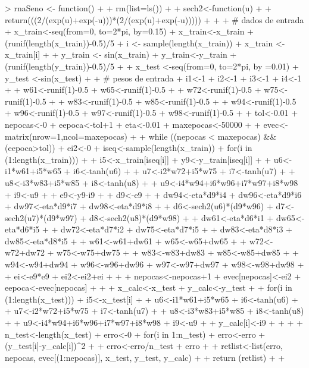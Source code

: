 \documentclass{article}
\begin{document}
\begin{Schunk}
\begin{Sinput}
>   rnaSeno <- function() {
+ 
+   rm(list=ls())
+ 
+   sech2<-function(u)
+   {
+     return(((2/(exp(u)+exp(-u)))*(2/(exp(u)+exp(-u))))) 
+   }
+ 
+   # dados de entrada
+   x_train<-seq(from=0, to=2*pi, by=0.15)
+   x_train<-x_train + (runif(length(x_train))-0.5)/5
+   i <- sample(length(x_train))
+   x_train <- x_train[i]
+ 
+   y_train <- sin(x_train)
+   y_train<-y_train + (runif(length(y_train))-0.5)/5
+ 
+   x_test <-seq(from=0, to=2*pi, by =0.01)
+   y_test <-sin(x_test)
+ 
+   # pesos de entrada
+   i1<-1
+   i2<-1
+   i3<-1
+   i4<-1
+ 
+   w61<-runif(1)-0.5
+   w65<-runif(1)-0.5
+ 
+   w72<-runif(1)-0.5
+   w75<-runif(1)-0.5
+ 
+   w83<-runif(1)-0.5
+   w85<-runif(1)-0.5
+ 
+   w94<-runif(1)-0.5
+   w96<-runif(1)-0.5
+   w97<-runif(1)-0.5
+   w98<-runif(1)-0.5
+ 
+   tol<-0.01
+   nepocas<-0
+   eepoca<-tol+1
+   eta<-0.01
+   maxepocas<-50000
+ 
+   evec<-matrix(nrow=1,ncol=maxepocas) 
+ 
+   while ((nepocas < maxepocas) && (eepoca>tol)){
+     ei2<-0
+     iseq<-sample(length(x_train))
+     for(i in (1:length(x_train))) {
+     
+       i5<-x_train[iseq[i]]
+       y9<-y_train[iseq[i]]
+       
+       u6<-i1*w61+i5*w65
+       i6<-tanh(u6)
+       
+       u7<-i2*w72+i5*w75
+       i7<-tanh(u7)
+       
+       u8<-i3*w83+i5*w85
+       i8<-tanh(u8)
+       
+       u9<-i4*w94+i6*w96+i7*w97+i8*w98
+       i9<-u9
+       
+       e9<-y9-i9
+       
+       d9<-e9
+       
+       dw94<-eta*d9*i4
+       dw96<-eta*d9*i6
+       dw97<-eta*d9*i7
+       dw98<-eta*d9*i8
+ 
+       d6<-sech2(u6)*(d9*w96)
+       d7<-sech2(u7)*(d9*w97)
+       d8<-sech2(u8)*(d9*w98)
+       
+       dw61<-eta*d6*i1
+       dw65<-eta*d6*i5
+ 
+       dw72<-eta*d7*i2
+       dw75<-eta*d7*i5
+ 
+       dw83<-eta*d8*i3
+       dw85<-eta*d8*i5
+ 
+       w61<-w61+dw61
+       w65<-w65+dw65
+ 
+       w72<-w72+dw72
+       w75<-w75+dw75
+ 
+       w83<-w83+dw83
+       w85<-w85+dw85
+ 
+       w94<-w94+dw94
+       w96<-w96+dw96
+       w97<-w97+dw97
+       w98<-w98+dw98
+ 
+       ei<-e9*e9
+       ei2<-ei2+ei
+     }
+     
+     nepocas<-nepocas+1 
+     evec[nepocas]<-ei2
+     eepoca<-evec[nepocas]
+   }
+ 
+   x_calc<-x_test
+   y_calc<-y_test
+ 
+   for(i in (1:length(x_test))) {
+     i5<-x_test[i]
+ 
+     u6<-i1*w61+i5*w65
+     i6<-tanh(u6)
+ 
+     u7<-i2*w72+i5*w75
+     i7<-tanh(u7)
+ 
+     u8<-i3*w83+i5*w85
+     i8<-tanh(u8)
+ 
+     u9<-i4*w94+i6*w96+i7*w97+i8*w98
+     i9<-u9
+ 
+     y_calc[i]<-i9
+ 
+   }
+ 
+   n_test<-length(x_test)
+   erro<-0
+   for(i in 1:n_test)
+     erro<-erro + (y_test[i]-y_calc[i])^2
+ 
+   erro<-erro/n_test
+   erro  
+ 
+   retlist<-list(erro, nepocas, evec[(1:nepocas)], x_test, y_test, y_calc)
+ 
+   return (retlist)
+ 
+ }
\end{Sinput}
\end{Schunk}
\end{document}
